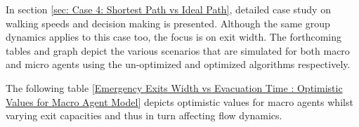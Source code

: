 In section \ref{sec: Case 4: Shortest Path vs Ideal Path}, detailed case study on walking speeds and decision making is presented. Although the same group dynamics applies to this case too, the focus is on exit width. The forthcoming tables and graph depict the various scenarios that are simulated for both macro and micro agents using the un-optimized and optimized algorithms respectively.

The following table \ref{Emergency Exits Width vs Evacuation Time : Optimistic Values for Macro Agent Model} depicts optimistic values for macro agents whilst varying exit capacities and thus in turn affecting flow dynamics.

\begin{table}[H]
\centering
{}
\end{table}
